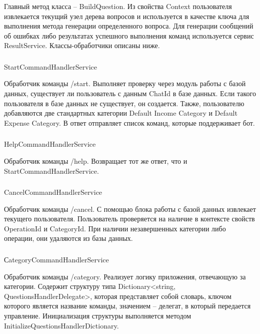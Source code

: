 Главный метод класса – BuildQuestion. Из свойства Context пользователя извлекается текущий узел дерева вопросов и используется в качестве ключа для выполнения метода генерации определенного вопроса.
Для генерации сообщений об ошибках либо результатах успешного выполнения команд используется сервис ResultService.
Классы-обработчики описаны ниже.

\subsubsection{} StartCommandHandlerService
\label{sec:design:server:StartCommandHandlerService}

Обработчик команды /start. Выполняет проверку через модуль работы с базой данных, существует ли пользователь с данным ChatId в базе данных. Если такого пользователя в базе данных не существует, он создается. Также, пользователю добавляются две стандартных категории Default Income Category и Default Expense Category. В ответ отправляет список команд, которые поддерживает бот.

\subsubsection{} HelpCommandHandlerService
\label{sec:design:server:HelpCommandHandlerService}

Обработчик команды /help. Возвращает тот же ответ, что и \linebreak StartCommandHandlerService.

\subsubsection{} CancelCommandHandlerService
\label{sec:design:server:CancelCommandHandlerService}

Обработчик команды /cancel. С помощью блока работы с базой данных извлекает текущего пользователя. Пользователь проверяется на наличие в контексте свойств OperationId и CategoryId. При наличии незавершенных категории либо операции, они удаляются из базы данных.

\subsubsection{} СategoryCommandHandlerService
\label{sec:design:server:СategoryCommandHandlerService}

Обработчик команды /category. Реализует логику приложения, отвечающую за категории. Содержит структуру типа Dictionary<string, \linebreak QuestionsHandlerDelegate>, которая представляет собой словарь, ключом которого является название команды, значением – делегат, в который передается управление.
Инициализация структуры выполняется методом \linebreak InitializeQuestionsHandlerDictionary.

